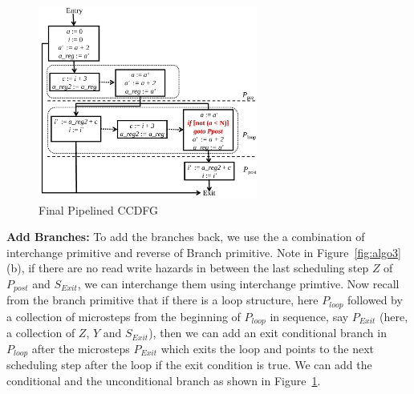 \begin{figure}[t!]
\begin{center}
\includegraphics[height=2.5in]{fig-proposal/algorithm-after-adding-branches}
\end{center}
\caption{Final Pipelined CCDFG}
\label{fig:algo4}
\end{figure}

{\bf Add Branches:}  To add the branches back, we use the a combination of interchange primitive and reverse of Branch primitive. Note in Figure~\ref{fig:algo3}(b), if there are no read write hazards in between the last scheduling step $Z$ of $P_{post}$ and $S_{Exit}$, we can interchange them using interchange primtive. Now recall from the branch primitive that if there is a loop structure, here $P_{loop}$ followed by a collection of microsteps from the beginning of $P_{loop}$ in sequence, say $P_{Exit}$ (here, a collection of $Z$, $Y$ and $S_{Exit}$), then we can add an exit conditional branch in $P_{loop}$ after the microsteps $P_{Exit}$ which exits the loop and points to the next scheduling step after the loop if the exit condition is true. We can add the conditional and the unconditional branch as shown in  Figure~\ref{fig:algo4}.  


